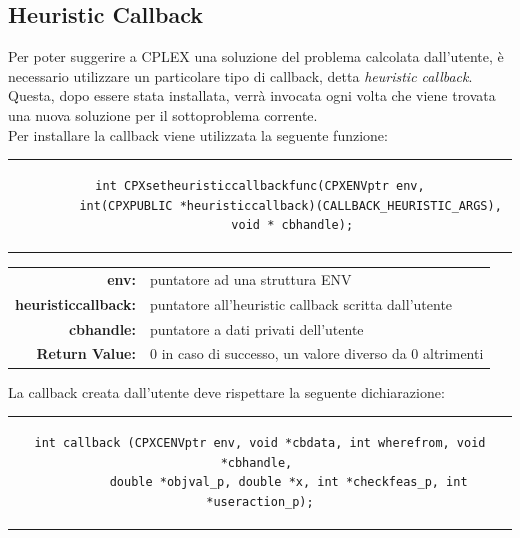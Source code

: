 \subsection{Heuristic Callback}
Per poter suggerire a CPLEX una soluzione del problema calcolata dall'utente, è necessario utilizzare un particolare tipo di callback, detta \textit{heuristic callback}. Questa, dopo essere stata installata, verrà invocata ogni volta che viene trovata una nuova soluzione per il sottoproblema corrente.\\
Per installare la callback viene utilizzata la seguente funzione:
\begin{center}
\begin{tabular}{c}
\begin{lstlisting}[linewidth=330pt, basicstyle=\footnotesize\sffamily,]    
int CPXsetheuristiccallbackfunc(CPXENVptr env,
		 int(CPXPUBLIC *heuristiccallback)(CALLBACK_HEURISTIC_ARGS), 
		 void * cbhandle);
\end{lstlisting}
\end{tabular}
\end{center}
\begin{table}[h]
\centering
\begin{tabular}{rl}
\textbf{env:} & {puntatore ad una struttura ENV}\\
\textbf{heuristiccallback:} & {puntatore all'heuristic callback scritta dall'utente}\\
\textbf{cbhandle:} & {puntatore a dati privati dell'utente}\\
\textbf{Return Value:} & {0 in caso di successo, un valore diverso da 0 altrimenti}\\
\end{tabular}
\end{table}
La callback creata dall'utente deve rispettare la seguente dichiarazione:
\begin{center}
\begin{tabular}{c}
\begin{lstlisting}[linewidth=382pt, basicstyle=\footnotesize\sffamily,] 
 int callback (CPXCENVptr env, void *cbdata, int wherefrom, void *cbhandle, 
 		double *objval_p, double *x, int *checkfeas_p, int *useraction_p);
\end{lstlisting}
\end{tabular}
\end{center}
